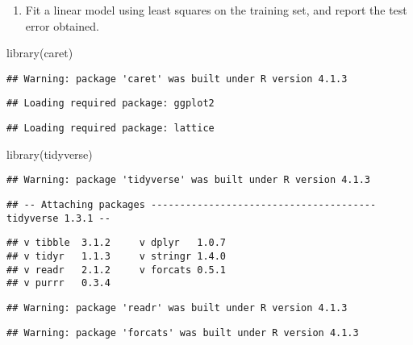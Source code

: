 \documentclass[
]{article}
\newenvironment{Shaded}{\begin{snugshade}}{\end{snugshade}}
\newcommand{\FunctionTok}[1]{\textcolor[rgb]{0.00,0.00,0.00}{#1}}
\newcommand{\NormalTok}[1]{#1}
\providecommand{\tightlist}{%
  \setlength{\itemsep}{0pt}\setlength{\parskip}{0pt}}
\begin{document}
\begin{enumerate}
\def\labelenumi{\alph{enumi})}
\setcounter{enumi}{1}
\tightlist
\item
  Fit a linear model using least squares on the training set, and report
  the test error obtained.
\end{enumerate}

\begin{Shaded}
\begin{Highlighting}[]
\FunctionTok{library}\NormalTok{(caret)}
\end{Highlighting}
\end{Shaded}

\begin{verbatim}
## Warning: package 'caret' was built under R version 4.1.3
\end{verbatim}

\begin{verbatim}
## Loading required package: ggplot2
\end{verbatim}

\begin{verbatim}
## Loading required package: lattice
\end{verbatim}

\begin{Shaded}
\begin{Highlighting}[]
\FunctionTok{library}\NormalTok{(tidyverse)}
\end{Highlighting}
\end{Shaded}

\begin{verbatim}
## Warning: package 'tidyverse' was built under R version 4.1.3
\end{verbatim}

\begin{verbatim}
## -- Attaching packages --------------------------------------- tidyverse 1.3.1 --
\end{verbatim}

\begin{verbatim}
## v tibble  3.1.2     v dplyr   1.0.7
## v tidyr   1.1.3     v stringr 1.4.0
## v readr   2.1.2     v forcats 0.5.1
## v purrr   0.3.4
\end{verbatim}

\begin{verbatim}
## Warning: package 'readr' was built under R version 4.1.3
\end{verbatim}

\begin{verbatim}
## Warning: package 'forcats' was built under R version 4.1.3
\end{verbatim}
\end{document}
